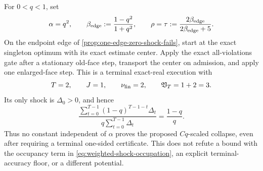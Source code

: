 \begin{proposition}
\label{prop:terminal-edge-no-q-packing}
For $0<q<1$, set
\begin{equation}
 \alpha=q^2,
 \qquad
 \beta_{\rm edge}:=\frac{1-q^2}{1+q^2},
 \qquad
 \rho=\tau:=\frac{2\beta_{\rm edge}}{2\beta_{\rm edge}+5}.
 \label{eq:terminal-edge-parameters}
\end{equation}
On the endpoint edge of \cref{prop:one-edge-zero-shock-fails}, start at the
exact singleton optimum with its exact estimate center.  Apply the exact
all-violations gate after a stationary old-face step, transport the center
on admission, and apply one enlarged-face step.  This is a terminal
exact-real execution with
\begin{equation}
 T=2,\qquad J=1,\qquad \nu_{\rm fin}=2,\qquad
 \mathfrak V_T=1+2=3.
 \label{eq:terminal-edge-stage-ledger}
\end{equation}
Its only shock is $\Delta_0>0$, and hence
\begin{equation}
 \frac{\sum_{t=0}^{T-1}(1-q)^{T-1-t}\Delta_t}
      {q\sum_{t=0}^{T-1}\Delta_t}
 =\frac{1-q}{q}.
 \label{eq:no-q-shock-packing}
\end{equation}
Thus no constant independent of $\alpha$ proves the proposed
$Cq$-scaled collapse, even after requiring a terminal one-sided certificate.
This does not refute a bound with the occupancy term in
\cref{eq:weighted-shock-occupation}, an explicit terminal-accuracy floor, or
a different potential.
\end{proposition}

